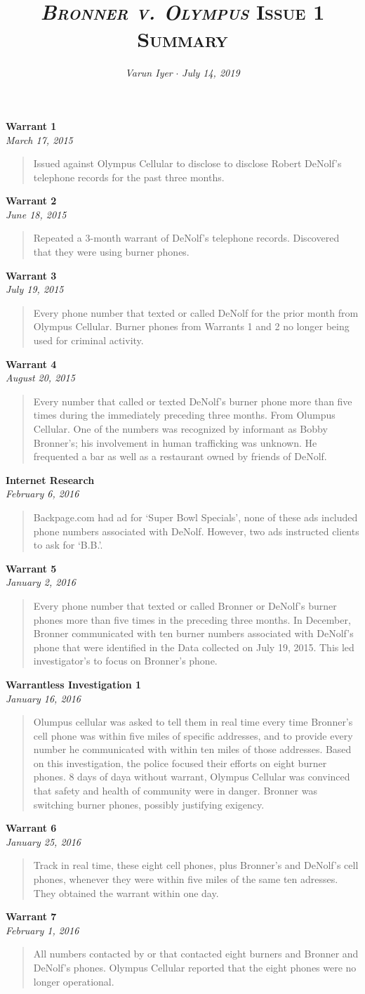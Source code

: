 \documentclass[paper=letter,fontsize=10pt]{article}
\title{\textsc{\textit{Bronner v. Olympus} Issue 1 Summary}}
\date{}
\author{\textit{Varun Iyer} \hspace{.5em} $\cdot$ \hspace{.5em} \textit{July 14, 2019}}
\newcommand{\inv}[3]{\noindent \textbf{#1} \\ \noindent \textit{#2} \begin{quote} #3 \end{quote} \par}
\begin{document}
\maketitle
\inv{Warrant 1}{March 17, 2015} {
	Issued against Olympus Cellular to disclose to disclose Robert DeNolf’s telephone records for the past three months.
}
\inv{Warrant 2}{June 18, 2015} {
	Repeated a 3-month warrant of DeNolf’s telephone records. Discovered that they were using burner phones.
}
\inv{Warrant 3}{July 19, 2015} {
	Every phone number that texted or called DeNolf for the prior month from Olympus Cellular.
	Burner phones from Warrants 1 and 2 no longer being used for criminal activity.
}
\inv{Warrant 4}{August 20, 2015} {
	Every number that called or texted DeNolf’s burner phone more than five times during the immediately preceding three months. From Olumpus Cellular.
	One of the numbers was recognized by informant as Bobby Bronner’s; his involvement in human trafficking was unknown.
	He frequented a bar as well as a restaurant owned by friends of DeNolf.
}
\inv{Internet Research}{February 6, 2016} {
	Backpage.com had ad for ‘Super Bowl Specials’, none of these ads included phone numbers associated with DeNolf.
	However, two ads instructed clients to ask for ‘B.B.’.
}
\inv{Warrant 5}{January 2, 2016} {
	Every phone number that texted or called Bronner or DeNolf’s burner phones more than five times in the preceding three months. In December, Bronner communicated with ten burner numbers associated with DeNolf’s phone that were identified in the Data collected on July 19, 2015.
	This led investigator’s to focus on Bronner’s phone.
}
\inv{Warrantless Investigation 1}{January 16, 2016} {
	Olumpus cellular was asked to tell them in real time every time Bronner’s cell phone was within five miles of specific addresses, and to provide every number he communicated with within ten miles of those addresses.
	Based on this investigation, the police focused their efforts on eight burner phones.
	8 days of daya without warrant, Olympus Cellular was convinced that safety and health of community were in danger.
	Bronner was switching burner phones, possibly justifying exigency.
}
\inv{Warrant 6}{January 25, 2016} {
	Track in real time, these eight cell phones, plus Bronner’s and DeNolf’s cell phones, whenever they were within five miles of the same ten adresses. They obtained the warrant within one day.
}
\inv{Warrant 7}{February 1, 2016} {
	All numbers contacted by or that contacted eight burners and Bronner and DeNolf’s phones. Olympus Cellular reported that the eight phones were no longer operational.
}
\end{document}
